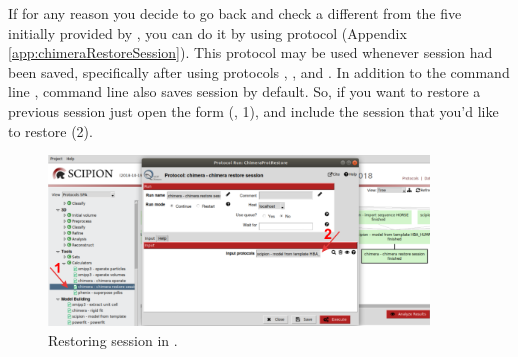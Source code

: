 If for any reason you decide to go back and check a different  from the five  initially provided by \modeller, you can do it by using  protocol (Appendix \ref{app:chimeraRestoreSession}). This protocol may be used whenever \chimera session had been saved, specifically after using protocols \chimera {}, \chimera {}, and \scipion {}. In addition to the \chimera command line , command line  also saves \chimera session by default. So, if you want to restore a previous session just open the form (, 1), and include the session that you'd like to restore (2).

 \begin{figure}[H]
  \centering 
  \captionsetup{width=.7\linewidth} 
  \includegraphics[width=0.90\textwidth]{Images/Fig17}
  \caption{Restoring session in \chimera.}
  \label{fig:restore_session_protocol}
  \end{figure}

